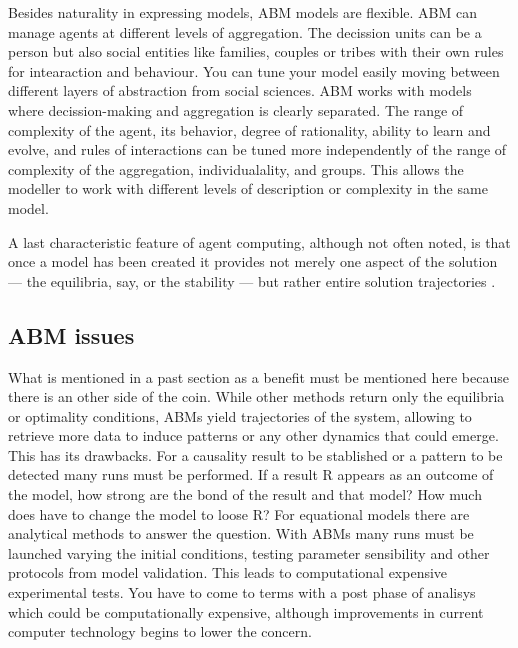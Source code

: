\documentclass[11pt,oneside,a4paper,openright]{report}
\begin{document}
Besides naturality in expressing models, ABM models are flexible. ABM can manage agents at different levels of aggregation. The decission units can be a person but also social entities like families, couples or tribes with their own rules for intearaction and behaviour. You can tune your model easily moving between different layers of abstraction from social sciences. ABM works with models where decission-making and aggregation is clearly separated. The range of complexity of the agent,  its behavior, degree of rationality, ability to learn and evolve, and rules of interactions can be tuned more independently of the range of complexity of the aggregation, individualality, and groups. This allows the modeller to work with different levels of description or complexity in the same model. %

A last characteristic feature of agent computing, although not often noted, is that once a model has been created it provides not merely one aspect of the solution — the equilibria, say, or the stability — but rather entire solution trajectories \cite{Axtell2000}.\\

\subsection{ABM issues}

What is mentioned in a past section as a benefit must be mentioned here because there is an other side of the coin.
While other methods return only the equilibria or optimality conditions, ABMs yield trajectories of the
system, allowing to retrieve more data to induce patterns or any other dynamics that could emerge. This has its
drawbacks. For a causality result to be stablished or a pattern to be detected many runs must be performed.
If a result R appears as an outcome of the model, how strong are the bond of the result and that model? How
much does have to change the model to loose R? For equational models there are analytical methods to answer
the question. With ABMs many runs must be launched varying the initial conditions, testing parameter sensibility
and other protocols from model validation. This leads to computational expensive experimental tests. 
You have to come to terms with a post phase of analisys which could be computationally expensive, although improvements
in current computer technology begins to lower the concern.
\cite{Axtell2000}
\end{document}
